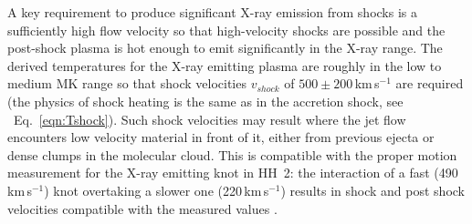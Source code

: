 A key requirement to produce significant X-ray emission from shocks is a sufficiently high flow velocity so that high-velocity shocks are possible and the post-shock plasma is hot enough to emit significantly in the X-ray range. The derived temperatures for the X-ray emitting plasma are roughly  in the low to medium MK range so that shock velocities $v_{shock}$ of $500\pm200$\,km\,s$^{-1}$ are required (the physics of shock heating is the same as in the accretion shock, see ~Eq.~\ref{eqn:Tshock}). Such shock velocities may result where the jet flow encounters low velocity  material in front of it, either from previous ejecta or dense clumps in the molecular cloud. This is compatible with the proper motion measurement for the X-ray emitting knot in HH~2: the interaction of a fast (490\,km\,s$^{-1}$) knot overtaking a slower one (220\,km\,s$^{-1}$) results in shock and post shock velocities compatible with the measured values \cite{Schneider_2012}.


